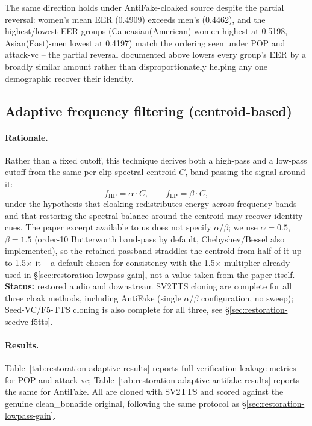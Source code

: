 \documentclass[11pt]{article}
\begin{document}
The same direction holds under AntiFake-cloaked source despite the
partial reversal: women's mean EER (0.4909) exceeds men's (0.4462), and
the highest/lowest-EER groups (Caucasian(American)-women highest at
0.5198, Asian(East)-men lowest at 0.4197) match the ordering seen under
POP and attack-vc -- the partial reversal documented above lowers every
group's EER by a broadly similar amount rather than disproportionately
helping any one demographic recover their identity.

\subsection{Adaptive frequency filtering (centroid-based)}
\label{sec:restoration-adaptive-filter}

\paragraph{Rationale.} Rather than a fixed cutoff, this technique
derives both a high-pass and a low-pass cutoff from the same per-clip
spectral centroid $C$, band-passing the signal around it:
\[
f_{\mathrm{HP}} = \alpha \cdot C, \qquad f_{\mathrm{LP}} = \beta \cdot C,
\]
under the hypothesis that cloaking redistributes energy across
frequency bands and that restoring the spectral balance around the
centroid may recover identity cues. The paper excerpt available to us
does not specify $\alpha$/$\beta$; we use $\alpha=0.5$, $\beta=1.5$
(order-10 Butterworth band-pass by default, Chebyshev/Bessel also
implemented), so the retained passband straddles the centroid from
half of it up to 1.5$\times$ it -- a default chosen for consistency
with the 1.5$\times$ multiplier already used in
\S\ref{sec:restoration-lowpass-gain}, not a value taken from the paper
itself. \textbf{Status:} restored audio and downstream SV2TTS cloning
are complete for all three cloak methods, including AntiFake (single
$\alpha$/$\beta$ configuration, no sweep); Seed-VC/F5-TTS cloning is
also complete for all three, see \S\ref{sec:restoration-seedvc-f5tts}.

\paragraph{Results.} Table~\ref{tab:restoration-adaptive-results}
reports full verification-leakage metrics for POP and attack-vc;
Table~\ref{tab:restoration-adaptive-antifake-results} reports the same
for AntiFake. All are cloned with SV2TTS and scored against the genuine
clean\_bonafide original, following the same protocol as
\S\ref{sec:restoration-lowpass-gain}.
\end{document}
